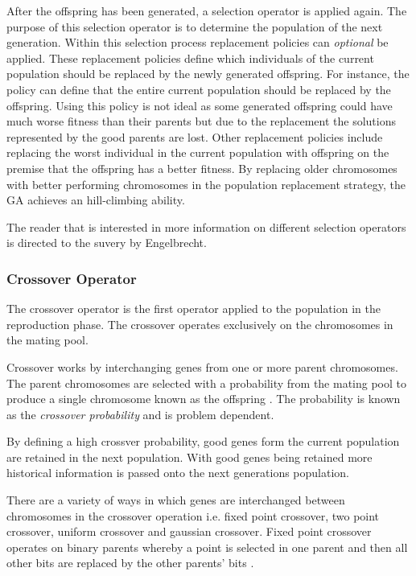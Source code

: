 After the offspring has been generated, a selection operator is applied again\cite{CompuIntelligenceIntro}. The purpose of this selection operator is to determine the population of the next generation\cite{CompuIntelligenceIntro}. Within this selection process replacement policies can \emph{optional} be applied\cite{CompuIntelligenceIntro}. These replacement policies define which individuals of the current population should be replaced by the newly generated offspring\cite{CompuIntelligenceIntro}. For instance, the policy can define that the entire current population should be replaced by the offspring\cite{CompuIntelligenceIntro}. Using this policy is not ideal as some generated offspring could have much worse fitness than their parents but due to the replacement the solutions represented by the good parents are lost\cite{CompuIntelligenceIntro}. Other replacement policies include replacing the worst individual in the current population with offspring on the premise that the offspring has a better fitness\cite{CompuIntelligenceIntro}. By replacing older chromosomes with better performing chromosomes in the population replacement strategy, the \gls{GA} achieves an hill-climbing ability.

The reader that is interested in more information on different selection operators is directed to the suvery by Engelbrecht\cite{CompuIntelligenceIntro}.
\subsubsection{Crossover Operator}
\label{sec:crossover}
The crossover operator is the first operator applied to the population in the reproduction phase. The crossover operates exclusively on the chromosomes in the mating pool. 

Crossover works by interchanging genes from one or more parent chromosomes. The parent chromosomes are selected with a probability from the mating pool to produce a single chromosome known as the offspring \cite{FamilyGA,HumanPassiveGA,CoactiveFuzzyGA}. The probability is known as the \emph{crossover probability} and is problem dependent\cite{CompuIntelligenceIntro}.

By defining a high crossver probability, good genes form the current population are retained in the next population\cite{CompuIntelligenceIntro}. With good genes being retained more historical information is passed onto the next generations population\cite{FamilyGA}.

There are a variety of ways in which genes are interchanged between chromosomes in the crossover operation i.e. fixed point crossover, two point crossover, uniform crossover and gaussian crossover\cite{CompuIntelligenceIntro}. Fixed point crossover operates on binary parents whereby a point is selected in one parent and then all other bits are replaced by the other parents' bits \cite{HumanPassiveGA}. 

